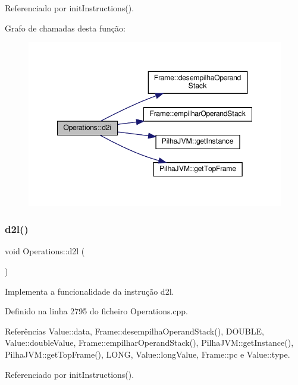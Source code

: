 Referenciado por init\+Instructions().

Grafo de chamadas desta função\+:
\nopagebreak
\begin{figure}[H]
\begin{center}
\leavevmode
\includegraphics[width=348pt]{classOperations_aa8cda1c04343e047078b72b51c575e1c_cgraph}
\end{center}
\end{figure}
\mbox{\label{classOperations_a2babf3c9e2ac30a70a07f8d43b32440a}} 
\subsubsection{\texorpdfstring{d2l()}{d2l()}}
{\footnotesize\ttfamily void Operations\+::d2l (\begin{DoxyParamCaption}{ }\end{DoxyParamCaption})\hspace{0.3cm}{\ttfamily [private]}}



Implementa a funcionalidade da instrução d2l. 



Definido na linha 2795 do ficheiro Operations.\+cpp.



Referências Value\+::data, Frame\+::desempilha\+Operand\+Stack(), D\+O\+U\+B\+LE, Value\+::double\+Value, Frame\+::empilhar\+Operand\+Stack(), Pilha\+J\+V\+M\+::get\+Instance(), Pilha\+J\+V\+M\+::get\+Top\+Frame(), L\+O\+NG, Value\+::long\+Value, Frame\+::pc e Value\+::type.



Referenciado por init\+Instructions().

